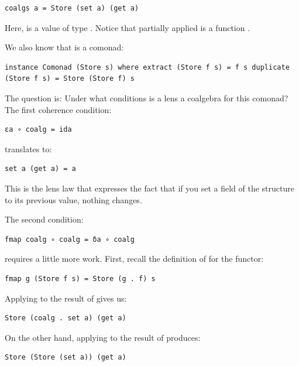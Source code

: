 \begin{verbatim}
coalgs a = Store (set a) (get a)
\end{verbatim}

Here,  is a value of type . Notice that partially
applied  is a function .

We also know that  is a comonad:

\begin{verbatim}
instance Comonad (Store s) where extract (Store f s) = f s duplicate (Store f s) = Store (Store f) s
\end{verbatim}

The question is: Under what conditions is a lens a coalgebra for this
comonad? The first coherence condition:

\begin{verbatim}
εa ∘ coalg = ida
\end{verbatim}

translates to:

\begin{verbatim}
set a (get a) = a
\end{verbatim}

This is the lens law that expresses the fact that if you set a field of
the structure  to its previous value, nothing changes.

The second condition:

\begin{verbatim}
fmap coalg ∘ coalg = δa ∘ coalg
\end{verbatim}

requires a little more work. First, recall the definition of
 for the  functor:

\begin{verbatim}
fmap g (Store f s) = Store (g . f) s
\end{verbatim}

Applying  to the result of  gives us:

\begin{verbatim}
Store (coalg . set a) (get a)
\end{verbatim}

On the other hand, applying  to the result of
 produces:

\begin{verbatim}
Store (Store (set a)) (get a)
\end{verbatim}

